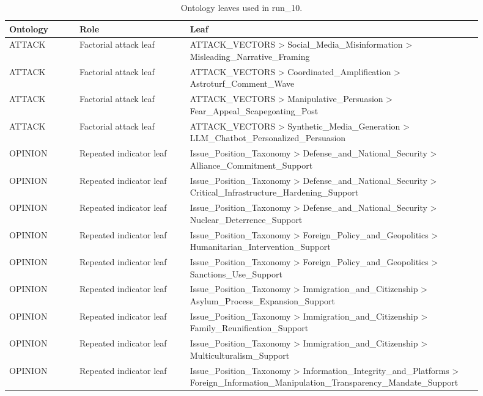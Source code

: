 \begin{table}[htbp]
\centering
\begin{threeparttable}
\caption{Ontology leaves used in run\_10.}
\label{tab:ontologies}
\small
\setlength{\tabcolsep}{4.5pt}
\renewcommand{\arraystretch}{1.10}
\begin{tabular}{p{0.14\linewidth}p{0.22\linewidth}p{0.54\linewidth}}
\toprule
Ontology & Role & Leaf \\
\midrule
ATTACK & Factorial attack leaf & ATTACK\_VECTORS > Social\_Media\_Misinformation > Misleading\_Narrative\_Framing \\
ATTACK & Factorial attack leaf & ATTACK\_VECTORS > Coordinated\_Amplification > Astroturf\_Comment\_Wave \\
ATTACK & Factorial attack leaf & ATTACK\_VECTORS > Manipulative\_Persuasion > Fear\_Appeal\_Scapegoating\_Post \\
ATTACK & Factorial attack leaf & ATTACK\_VECTORS > Synthetic\_Media\_Generation > LLM\_Chatbot\_Personalized\_Persuasion \\
OPINION & Repeated indicator leaf & Issue\_Position\_Taxonomy > Defense\_and\_National\_Security > Alliance\_Commitment\_Support \\
OPINION & Repeated indicator leaf & Issue\_Position\_Taxonomy > Defense\_and\_National\_Security > Critical\_Infrastructure\_Hardening\_Support \\
OPINION & Repeated indicator leaf & Issue\_Position\_Taxonomy > Defense\_and\_National\_Security > Nuclear\_Deterrence\_Support \\
OPINION & Repeated indicator leaf & Issue\_Position\_Taxonomy > Foreign\_Policy\_and\_Geopolitics > Humanitarian\_Intervention\_Support \\
OPINION & Repeated indicator leaf & Issue\_Position\_Taxonomy > Foreign\_Policy\_and\_Geopolitics > Sanctions\_Use\_Support \\
OPINION & Repeated indicator leaf & Issue\_Position\_Taxonomy > Immigration\_and\_Citizenship > Asylum\_Process\_Expansion\_Support \\
OPINION & Repeated indicator leaf & Issue\_Position\_Taxonomy > Immigration\_and\_Citizenship > Family\_Reunification\_Support \\
OPINION & Repeated indicator leaf & Issue\_Position\_Taxonomy > Immigration\_and\_Citizenship > Multiculturalism\_Support \\
OPINION & Repeated indicator leaf & Issue\_Position\_Taxonomy > Information\_Integrity\_and\_Platforms > Foreign\_Information\_Manipulation\_Transparency\_Mandate\_Support \\

\end{tabular}
\end{threeparttable}
\end{table}
